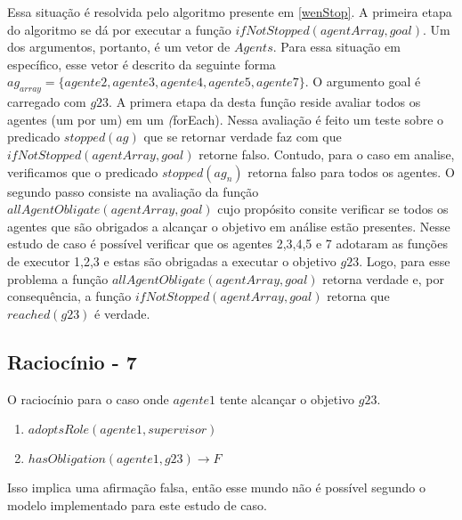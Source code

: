 Essa situação é resolvida pelo algoritmo presente em \ref{wenStop}. A primeira etapa do algoritmo se dá por executar a função $ifNotStopped(agentArray,goal)$. Um dos argumentos, portanto, é um vetor de $Agents$. Para essa situação em específico, esse vetor é descrito da seguinte forma $ag_{array} = \{ agente2,agente3,agente4,agente5,agente7 \}$. O argumento goal é carregado com $g23$. A primera etapa da desta função reside avaliar todos os agentes (um por um) em um \textit(forEach). Nessa avaliação é feito um teste sobre o predicado $stopped(ag)$ que se retornar verdade faz com que $ifNotStopped(agentArray,goal)$ retorne falso. Contudo, para o caso em analise, verificamos que o predicado $stopped(ag_n)$ retorna falso para todos os agentes. O segundo passo consiste na avaliação da função $allAgentObligate(agentArray,goal)$ cujo propósito consite verificar se todos os agentes que são obrigados a alcançar o objetivo em análise estão presentes. Nesse estudo de caso é possível verificar que os agentes 2,3,4,5 e 7 adotaram as funções de executor 1,2,3 e estas são obrigadas a executar o objetivo $g23$. Logo, para esse problema a função $allAgentObligate(agentArray,goal)$ retorna verdade e, por consequência, a função $ifNotStopped(agentArray,goal)$ retorna que $reached(g23)$ é verdade.  


\subsection{Raciocínio - 7}
\label{raciocinio7}
O raciocínio para o caso onde $agente1$ tente alcançar o objetivo $g23$.  

\begin{enumerate}
	\item $adoptsRole(agente1,supervisor)$
	\item $hasObligation(agente1,g23) \to F$										
\end{enumerate}

Isso implica uma afirmação falsa, então esse mundo não é possível segundo o modelo implementado para este estudo de caso.